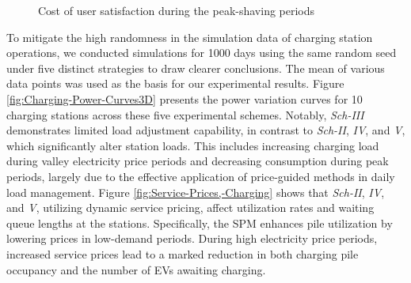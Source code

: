 \documentclass[preprint,12pt]{elsarticle}
\begin{document}
\begin{figure}[htbp]
\noindent \begin{centering}
\par\end{centering}
\caption{Cost of user satisfaction during the peak-shaving periods}
\label{fig:Cost-of-user}
\end{figure}

To mitigate the high randomness in the simulation data of charging station operations, we conducted simulations for 1000 days using the same random seed under five distinct strategies to draw clearer conclusions.  The mean of various data points was used as the basis for our experimental results. Figure \ref{fig:Charging-Power-Curves3D} presents the power variation curves for 10 charging stations across these five experimental schemes. Notably, \emph{Sch-III} demonstrates limited load adjustment capability, in contrast to \emph{Sch-II}, \emph{IV}, and \emph{V}, which significantly alter station loads. This includes increasing charging load during valley electricity price periods and decreasing consumption during peak periods, largely due to the effective application of price-guided methods in daily load management. Figure \ref{fig:Service-Prices,-Charging} shows that \emph{Sch-II}, \emph{IV}, and \emph{V}, utilizing dynamic service pricing, affect utilization rates and waiting queue lengths at the stations. Specifically, the SPM enhances pile utilization by lowering prices in low-demand periods. During high electricity price periods, increased service prices lead to a marked reduction in both charging pile occupancy and the number of EVs awaiting charging.
\end{document}
